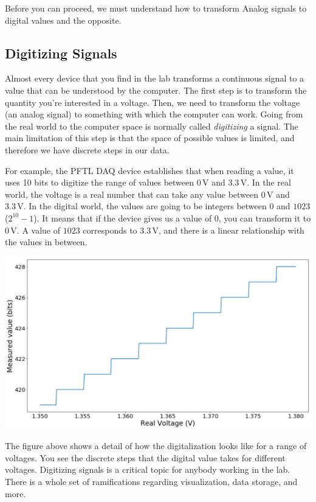 Before you can proceed, we must understand how to transform Analog signals to digital values and the opposite.

\subsection{Digitizing Signals}\label{subsec:adc-dca}
Almost every device that you find in the lab transforms a continuous signal to a value that can be understood by the computer. The first step is to transform the quantity you're interested in a voltage. Then, we need to transform the voltage (an analog signal) to something with which the computer can work. Going from the real world to the computer space is normally called \emph{digitizing} a signal. The main limitation of this step is that the space of possible values is limited, and therefore we have discrete steps in our data.

For example, the {PFTL DAQ} device establishes that when reading a value, it uses 10 bits to digitize the range of values between $0\,\textrm{V}$ and $3.3\,\textrm{V}$. In the real world, the voltage is a real number that can take any value between $0\,\textrm{V}$ and $3.3\,\textrm{V}$. In the digital world, the values are going to be integers between $0$ and $1023$ ($2^{10}-1$). It means that if the device gives us a value of $0$, you can transform it to $0\,\textrm{V}$. A value of $1023$ corresponds to $3.3\,\textrm{V}$, and there is a linear relationship with the values in between.

\begin{center}
\includegraphics[width=.6\textwidth]{images/Chapter_03/digitalization.png}
\end{center}

The figure above shows a detail of how the digitalization looks like for a range of voltages. You see the discrete steps that the digital value takes for different voltages. Digitizing signals is a critical topic for anybody working in the lab. There is a whole set of ramifications regarding visualization, data storage, and more.

